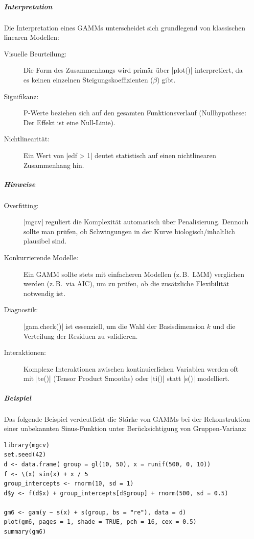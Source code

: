 \documentclass[10pt,twocolumn]{scrartcl}
\renewcommand{\lstinline}{\mycoloredinline}
\begin{document}
\subparagraph{Interpretation}

Die Interpretation eines GAMMs unterscheidet sich grundlegend von klassischen linearen Modellen:
\begin{description}
\item[Visuelle Beurteilung:] Die Form des Zusammenhangs wird primär über \lstinline|plot()| interpretiert, da es keinen einzelnen Steigungskoeffizienten ($\beta$) gibt.
\item[Signifikanz:] P-Werte beziehen sich auf den gesamten Funktionsverlauf (Nullhypothese: Der Effekt ist eine Null-Linie).
\item[Nichtlinearität:] Ein Wert von \lstinline|edf > 1| deutet statistisch auf einen nichtlinearen Zusammenhang hin.
\end{description}

\subparagraph{Hinweise}

\begin{description}
\item[Overfitting:] \lstinline|mgcv| reguliert die Komplexität automatisch über Penalisierung. Dennoch sollte man prüfen, ob Schwingungen in der Kurve biologisch/inhaltlich plausibel sind.
\item[Konkurrierende Modelle:] Ein GAMM sollte stets mit einfacheren Modellen (z.\,B.\ LMM) verglichen werden (z.\,B.\ via AIC), um zu prüfen, ob die zusätzliche Flexibilität notwendig ist.
\item[Diagnostik:] \lstinline|gam.check()| ist essenziell, um die Wahl der Basisdimension $k$ und die Verteilung der Residuen zu validieren.
\item[Interaktionen:] Komplexe Interaktionen zwischen kontinuierlichen Variablen werden oft mit \lstinline|te()| (Tensor Product Smooths) oder \lstinline|ti()| statt \lstinline|s()| modelliert.
\end{description}

\subparagraph{Beispiel}

Das folgende Beispiel verdeutlicht die Stärke von GAMMs bei der Rekonstruktion einer unbekannten Sinus-Funktion unter Berücksichtigung von Gruppen-Varianz:

\begin{lstlisting}
library(mgcv)
set.seed(42)
d <- data.frame( group = gl(10, 50), x = runif(500, 0, 10))
f <- \(x) sin(x) + x / 5
group_intercepts <- rnorm(10, sd = 1)
d$y <- f(d$x) + group_intercepts[d$group] + rnorm(500, sd = 0.5)

gm6 <- gam(y ~ s(x) + s(group, bs = "re"), data = d)
plot(gm6, pages = 1, shade = TRUE, pch = 16, cex = 0.5)
summary(gm6)
\end{lstlisting}
\end{document}
